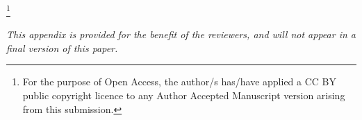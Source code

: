 
{\let\thefootnote\relax\footnote{{For the purpose of Open Access, the author/s has/have applied a CC BY public copyright licence to any Author Accepted Manuscript version arising from this submission.}}}



   \clearpage
   \emph{This appendix is provided for the benefit of the reviewers, and will not appear in a final version of this paper.}
   \appendix
%


